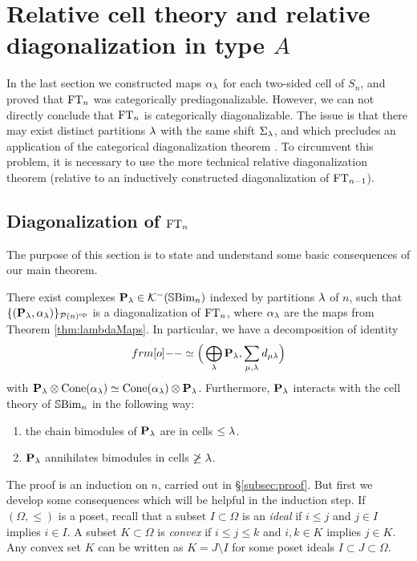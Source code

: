 \section{Relative cell theory and relative diagonalization in type $A$}
\label{sec:diag}

In the last section we constructed maps $\alpha_\lambda$ for each two-sided cell of $S_n$, and proved that $\operatorname{FT}_n$ was categorically prediagonalizable. However, we can not directly conclude that
$\operatorname{FT}_n$ is categorically diagonalizable. The issue is that there may exist distinct partitions $\lambda$ with the same shift $\Sigma_\lambda$, and which precludes an application of the categorical
diagonalization theorem \cite[Theorem 8.1]{ElHog17a}. To circumvent this problem, it is necessary to use the more technical relative diagonalization theorem \cite[Theorem 8.2]{ElHog17a}
(relative to an inductively constructed diagonalization of $\operatorname{FT}_{n-1}$).


\subsection{Diagonalization of $\operatorname{FT}_n$}

The purpose of this section is to state and understand some basic consequences of our main theorem.

\begin{theorem}\label{thm:typeAdiag}
There exist complexes ${\mathbf P}_\lambda\in {\mathcal{K}}^-({\mathbb{S}}{\rm Bim }_n)$ indexed by partitions $\lambda$ of $n$, such that $\{({\mathbf P}_\lambda, \alpha_{\lambda})\}_{{\mathcal{P}}(n)^{\operatorname{op}}}$ is a diagonalization of $\operatorname{FT}_n$, where $\alpha_\lambda$ are the maps from Theorem \ref{thm:lambdaMaps}.  In particular, we have a decomposition of identity 
\begin{equation}\label{eq:resofId}
\one \simeq \Big(\bigoplus_{\l} \PB_\l, \sum_{\mu,\l} d_{\mu\l}\Big)
\end{equation}
with ${\mathbf P}_\lambda\otimes \operatorname{Cone}(\alpha_\lambda) \simeq \operatorname{Cone}(\alpha_\lambda)\otimes {\mathbf P}_\lambda$.  Furthermore, ${\mathbf P}_\lambda$ interacts with the cell theory of ${\mathbb{S}}{\rm Bim }_n$ in the following way:
\begin{enumerate}\setlength{\itemsep}{2pt}
\item the chain bimodules of ${\mathbf P}_\lambda$ are in cells $\leq \lambda$.
\item ${\mathbf P}_\lambda$ annihilates bimodules in cells $\not\geq \lambda$.
\end{enumerate}
\end{theorem}

The proof is an induction on $n$, carried out in \S \ref{subsec:proof}.  But first we develop some consequences which will be helpful in the induction step.  If $(\Omega,\leq)$ is a poset, recall that a subset $I\subset \Omega$ is an \emph{ideal} if $i\leq j$ and $j\in I$ implies $i\in I$.  A subset $K\subset \Omega$ is \emph{convex} if $i\leq j\leq k$ and $i,k\in K$ implies $j\in K$.  Any convex set $K$ can be written as $K=J\setminus I$ for some poset ideals $I\subset J\subset \Omega$.

